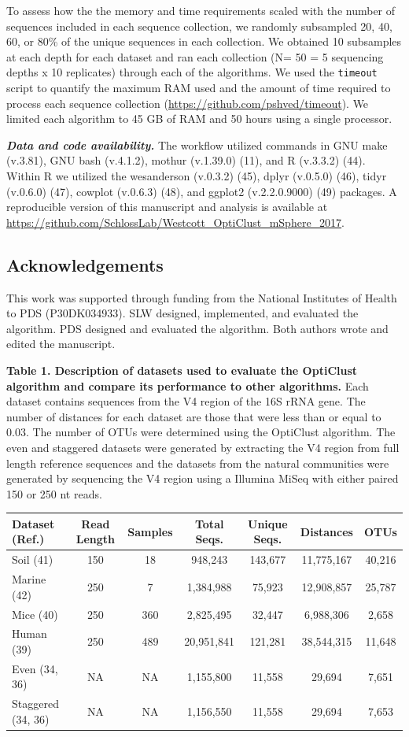 \documentclass[11pt,]{article}
\begin{document}
To assess how the the memory and time requirements scaled with the
number of sequences included in each sequence collection, we randomly
subsampled 20, 40, 60, or 80\% of the unique sequences in each
collection. We obtained 10 subsamples at each depth for each dataset and
ran each collection (N= 50 = 5 sequencing depths x 10 replicates)
through each of the algorithms. We used the \texttt{timeout} script to
quantify the maximum RAM used and the amount of time required to process
each sequence collection (\url{https://github.com/pshved/timeout}). We
limited each algorithm to 45 GB of RAM and 50 hours using a single
processor.

\textbf{\emph{Data and code availability.}} The workflow utilized
commands in GNU make (v.3.81), GNU bash (v.4.1.2), mothur (v.1.39.0)
(11), and R (v.3.3.2) (44). Within R we utilized the wesanderson
(v.0.3.2) (45), dplyr (v.0.5.0) (46), tidyr (v.0.6.0) (47), cowplot
(v.0.6.3) (48), and ggplot2 (v.2.2.0.9000) (49) packages. A reproducible
version of this manuscript and analysis is available at
\url{https://github.com/SchlossLab/Westcott_OptiClust_mSphere_2017}.

\subsection{Acknowledgements}\label{acknowledgements}

This work was supported through funding from the National Institutes of
Health to PDS (P30DK034933). SLW designed, implemented, and evaluated
the algorithm. PDS designed and evaluated the algorithm. Both authors
wrote and edited the manuscript.

\newpage

\textbf{Table 1. Description of datasets used to evaluate the OptiClust
algorithm and compare its performance to other algorithms.} Each dataset
contains sequences from the V4 region of the 16S rRNA gene. The number
of distances for each dataset are those that were less than or equal to
0.03. The number of OTUs were determined using the OptiClust algorithm.
The even and staggered datasets were generated by extracting the V4
region from full length reference sequences and the datasets from the
natural communities were generated by sequencing the V4 region using a
Illumina MiSeq with either paired 150 or 250 nt reads.

\begin{longtable}[c]{@{}lcccccc@{}}
\toprule
\textbf{Dataset (Ref.)} & \textbf{Read Length} & \textbf{Samples} &
\textbf{Total Seqs.} & \textbf{Unique Seqs.} & \textbf{Distances} &
\textbf{OTUs}\tabularnewline
\midrule
\endhead
Soil (41) & 150 & 18 & 948,243 & 143,677 & 11,775,167 &
40,216\tabularnewline
Marine (42) & 250 & 7 & 1,384,988 & 75,923 & 12,908,857 &
25,787\tabularnewline
Mice (40) & 250 & 360 & 2,825,495 & 32,447 & 6,988,306 &
2,658\tabularnewline
Human (39) & 250 & 489 & 20,951,841 & 121,281 & 38,544,315 &
11,648\tabularnewline
Even (34, 36) & NA & NA & 1,155,800 & 11,558 & 29,694 &
7,651\tabularnewline
Staggered (34, 36) & NA & NA & 1,156,550 & 11,558 & 29,694 &
7,653\tabularnewline
\bottomrule
\end{longtable}
\end{document}
